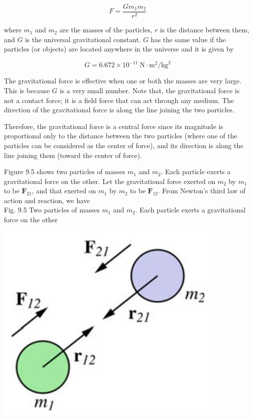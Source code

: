 \documentclass[10pt]{article}
\begin{document}
$$
F=\frac{G m_{1} m_{2}}{r^{2}}
$$

where $m_{1}$ and $m_{2}$ are the masses of the particles, $r$ is the distance between them, and $G$ is the universal gravitational constant. $G$ has the same value if the particles (or objects) are located anywhere in the universe and it is given by

$$
G=6.672 \times 10^{-11} \mathrm{~N} \cdot \mathrm{m}^{2} / \mathrm{kg}^{2}
$$

The gravitational force is effective when one or both the masses are very large. This is because $G$ is a very small number. Note that, the gravitational force is not a contact force; it is a field force that can act through any medium. The direction of the gravitational force is along the line joining the two particles.

Therefore, the gravitational force is a central force since its magnitude is proportional only to the distance between the two particles (where one of the particles can be considered as the center of force), and its direction is along the line joining them (toward the center of force).

Figure 9.5 shows two particles of masses $m_{1}$ and $m_{2}$. Each particle exerts a gravitational force on the other. Let the gravitational force exerted on $m_{2}$ by $m_{1}$ to be $\mathbf{F}_{21}$, and that exerted on $m_{1}$ by $m_{2}$ to be $\mathbf{F}_{12}$. From Newton's third law of action and reaction, we have\\
Fig. 9.5 Two particles of masses $m_{1}$ and $m_{2}$. Each particle exerts a gravitational force on the other

\begin{center}
\includegraphics[max width=\textwidth]{2024_09_13_db1f357d2aad0a03eb2eg-145}
\end{center}
\end{document}
